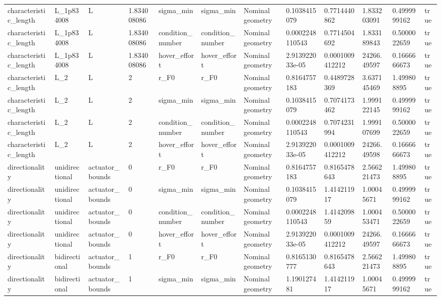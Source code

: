 \begin{tabular}{@{}llllllllllll@{}}
characteristic\_length & L\_1p834008 & L & 1.834008086 & sigma\_min & sigma\_min & Nominal geometry & 0.1038415079 & 0.7714440862 & 1.833203091 & 0.4999999162 & true \\
characteristic\_length & L\_1p834008 & L & 1.834008086 & condition\_number & condition\_number & Nominal geometry & 0.0002248110543 & 0.7714504692 & 1.833189843 & 0.5000022659 & true \\
characteristic\_length & L\_1p834008 & L & 1.834008086 & hover\_effort & hover\_effort & Nominal geometry & 2.913922033e-05 & 0.0001009412212 & 24266.49597 & 0.1666666673 & true \\
characteristic\_length & L\_2 & L & 2 & r\_F0 & r\_F0 & Nominal geometry & 0.8164757183 & 0.4489728369 & 3.637145469 & 1.499808895 & true \\
characteristic\_length & L\_2 & L & 2 & sigma\_min & sigma\_min & Nominal geometry & 0.1038415079 & 0.7074173462 & 1.999122145 & 0.4999999162 & true \\
characteristic\_length & L\_2 & L & 2 & condition\_number & condition\_number & Nominal geometry & 0.0002248110543 & 0.7074231994 & 1.999107699 & 0.5000022659 & true \\
characteristic\_length & L\_2 & L & 2 & hover\_effort & hover\_effort & Nominal geometry & 2.913922033e-05 & 0.0001009412212 & 24266.49598 & 0.1666666673 & true \\
directionality & unidirectional & actuator\_bounds & 0 & r\_F0 & r\_F0 & Nominal geometry & 0.8164757183 & 0.8165478643 & 2.566221473 & 1.499808895 & true \\
directionality & unidirectional & actuator\_bounds & 0 & sigma\_min & sigma\_min & Nominal geometry & 0.1038415079 & 1.414211917 & 1.00045671 & 0.4999999162 & true \\
directionality & unidirectional & actuator\_bounds & 0 & condition\_number & condition\_number & Nominal geometry & 0.0002248110543 & 1.414209859 & 1.000453471 & 0.5000022659 & true \\
directionality & unidirectional & actuator\_bounds & 0 & hover\_effort & hover\_effort & Nominal geometry & 2.913922033e-05 & 0.0001009412212 & 24266.49597 & 0.1666666673 & true \\
directionality & bidirectional & actuator\_bounds & 1 & r\_F0 & r\_F0 & Nominal geometry & 0.8165130777 & 0.8165478643 & 2.566221473 & 1.499808895 & true \\
directionality & bidirectional & actuator\_bounds & 1 & sigma\_min & sigma\_min & Nominal geometry & 1.190127481 & 1.414211917 & 1.00045671 & 0.4999999162 & true \\

\end{tabular}
